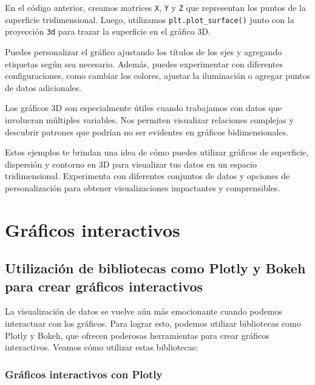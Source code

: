\documentclass[
  a4paper,
]{article}
\begin{document}
En el código anterior, creamos matrices \texttt{X}, \texttt{Y} y
\texttt{Z} que representan los puntos de la superficie tridimensional.
Luego, utilizamos \texttt{plt.plot\_surface()} junto con la proyección
\texttt{\textquotesingle{}3d\textquotesingle{}} para trazar la
superficie en el gráfico 3D.

Puedes personalizar el gráfico ajustando los títulos de los ejes y
agregando etiquetas según sea necesario. Además, puedes experimentar con
diferentes configuraciones, como cambiar los colores, ajustar la
iluminación o agregar puntos de datos adicionales.

Los gráficos 3D son especialmente útiles cuando trabajamos con datos que
involucran múltiples variables. Nos permiten visualizar relaciones
complejas y descubrir patrones que podrían no ser evidentes en gráficos
bidimensionales.

Estos ejemplos te brindan una idea de cómo puedes utilizar gráficos de
superficie, dispersión y contorno en 3D para visualizar tus datos en un
espacio tridimensional. Experimenta con diferentes conjuntos de datos y
opciones de personalización para obtener visualizaciones impactantes y
comprensibles.

\hypertarget{gruxe1ficos-interactivos}{%
\section{Gráficos interactivos}\label{gruxe1ficos-interactivos}}

\hypertarget{utilizaciuxf3n-de-bibliotecas-como-plotly-y-bokeh-para-crear-gruxe1ficos-interactivos}{%
\subsection{Utilización de bibliotecas como Plotly y Bokeh para crear
gráficos
interactivos}\label{utilizaciuxf3n-de-bibliotecas-como-plotly-y-bokeh-para-crear-gruxe1ficos-interactivos}}

La visualización de datos se vuelve aún más emocionante cuando podemos
interactuar con los gráficos. Para lograr esto, podemos utilizar
bibliotecas como Plotly y Bokeh, que ofrecen poderosas herramientas para
crear gráficos interactivos. Veamos cómo utilizar estas bibliotecas:

\hypertarget{gruxe1ficos-interactivos-con-plotly}{%
\subsubsection{Gráficos interactivos con
Plotly}\label{gruxe1ficos-interactivos-con-plotly}}
\end{document}
